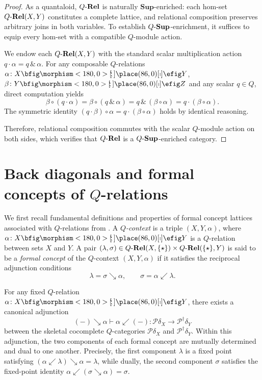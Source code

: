 \documentclass{tac}
\begin{document}
\begin{proof}
As a quantaloid, \(Q\text{-}\mathbf{Rel}\) is naturally \(\mathbf{Sup}\)-enriched: each hom-set \(Q\text{-}\mathbf{Rel}(X,Y)\) constitutes a complete lattice, and relational composition preserves arbitrary joins in both variables. To establish \({Q\text{-}\mathbf{Sup}}\)-enrichment, it suffices to equip every hom-set with a compatible \(Q\)-module action.

We endow each \(Q\text{-}\mathbf{Rel}(X,Y)\) with the standard scalar multiplication action \(q\cdot\alpha = q\,\&\,\alpha\). For any composable \(Q\)-relations \(\alpha\colon X\nto Y\), \(\beta\colon Y\nto Z\) and any scalar \(q\in Q\), direct computation yields
\[
\beta\circ(q\cdot\alpha) =\beta\circ(q\,\&\,\alpha) = q\,\&\,\left(\beta\circ\alpha\right) = q\cdot\left(\beta\circ\alpha\right).
\]
The symmetric identity \((q\cdot\beta)\circ\alpha = q\cdot(\beta\circ\alpha)\) holds by identical reasoning.

Therefore, relational composition commutes with the scalar \(Q\)-module action on both sides, which verifies that \(Q\text{-}\mathbf{Rel}\) is a \({Q\text{-}\mathbf{Sup}}\)-enriched category.
\end{proof}


\section{Back diagonals and formal concepts of $Q$-relations}\label{sec:backdiag}
We first recall fundamental definitions and properties of formal concept lattices associated with $Q$-relations from \cite{Belohlavek2002,Shen2016}. A \emph{$Q$-context} is a triple $(X,Y,\alpha)$, where $\alpha\colon X\nto Y$ is a $Q$-relation between sets $X$ and $Y$. A pair $(\lambda,\sigma)\in Q\text{-}\mathbf{Rel}(X,{\{\star\}})\times Q\text{-}\mathbf{Rel}({\{\star\}},Y)$ is said to be a \emph{formal concept} of the $Q$-context $(X,Y,\alpha)$ if it satisfies the reciprocal adjunction conditions
\[
\lambda=\sigma\searrow\alpha,\qquad \sigma=\alpha\swarrow\lambda.
\]

For any fixed $Q$-relation $\alpha\colon X\nto Y$, there exists a canonical adjunction
\[
(-)\searrow\alpha\vdash\alpha\swarrow(-)\colon\mathcal{P}\delta_X\to\mathcal{P}^\dagger\delta_Y
\]
between the skeletal cocomplete $Q$-categories $\mathcal{P}\delta_X$ and $\mathcal{P}^\dagger\delta_Y$. Within this adjunction, the two components of each formal concept are mutually determined and dual to one another. Precisely, the first component $\lambda$ is a fixed point satisfying $(\alpha\swarrow\lambda)\searrow\alpha=\lambda$, while dually, the second component $\sigma$ satisfies the fixed-point identity $\alpha\swarrow(\sigma\searrow\alpha)=\sigma$.
\end{document}
